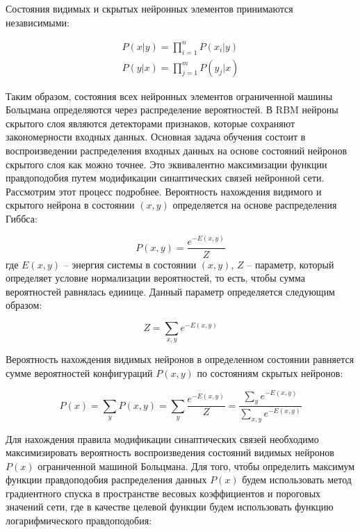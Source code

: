Состояния видимых и скрытых нейронных элементов принимаются независимыми:

\begin{equation*}
	\begin{aligned}
		P(x \lvert y) = \prod_{i=1}^n P(x_i \lvert y)\\
		P(y \lvert x) = \prod_{j=1}^m P(y_j \lvert x)
	\end{aligned}	
\end{equation*}

Таким образом, состояния всех нейронных элементов ограниченной машины Больцмана определяются через распределение вероятностей. В RBM нейроны скрытого слоя являются детекторами признаков, которые сохраняют закономерности входных данных. Основная задача обучения состоит в воспроизведении распределения входных данных на основе состояний нейронов скрытого слоя как можно точнее. Это эквивалентно  максимизации функции правдоподобия путем модификации синаптических связей нейронной сети. Рассмотрим этот процесс подробнее. 
Вероятность нахождения видимого и скрытого нейрона в состоянии $(x, y)$ определяется на основе распределения Гиббса:

\begin{equation*}
	P(x, y)=\frac{e^{-E(x,y)}}{Z}
\end{equation*}
где $E(x,y)$ -- энергия системы в состоянии $(x,y)$, $Z$ -- параметр, который определяет условие нормализации вероятностей, то есть, чтобы сумма вероятностей равнялась единице. Данный параметр определяется следующим образом:

\begin{equation*}
	Z=\sum_{x,y} e^{-E(x,y)}
\end{equation*}

Вероятность нахождения видимых нейронов в определенном состоянии равняется сумме вероятностей  конфигураций $P(x,y)$ по состояниям скрытых нейронов:

\begin{equation*}
	P(x)=\sum_y P(x,y)=\sum_y \frac{e^{-E(x,y)}}{Z}=\frac{\sum_y e^{-E(x,y)}}{\sum_{x,y} e^{-E(x,y)}}
\end{equation*}

Для нахождения правила модификации синаптических связей необходимо максимизировать вероятность воспроизведения состояний видимых нейронов $P(x)$ ограниченной машиной Больцмана. Для того, чтобы определить максимум функции правдоподобия распределения данных $P(x)$ будем использовать метод градиентного спуска в пространстве весовых коэффициентов и пороговых значений сети, где в качестве целевой функции будем использовать функцию логарифмического правдоподобия:

